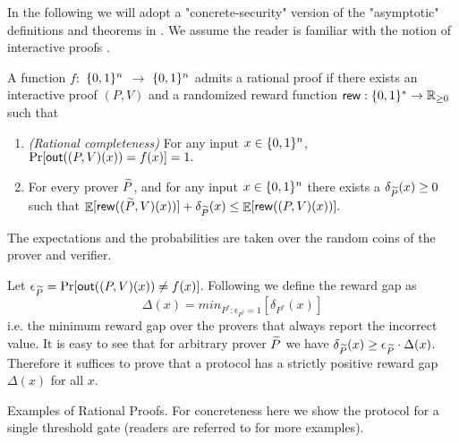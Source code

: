 
In the following we will adopt a "concrete-security" version of the "asymptotic" definitions and theorems in \cite{am1,rosen}. We assume the reader is familiar with the notion of interactive proofs \cite{gmr}. 

\noindent
\begin{mydef}
\label{def:RP-delta}
\label{def:RP}
A function $f:$ $\{0, 1\}^n$ $\to$ $\{0, 1\}^n$ admits a rational proof if there exists an interactive proof $(P,V)$ and a randomized reward function
$\mathsf{rew} : \{0, 1\}^{*} \to \mathbb{R}_{\geq 0}$ such that

\begin{enumerate}
\item \emph{(Rational completeness)} For any input $x \in 
\{0, 1\}^n$, $\Pr[\mathsf{out}((P,V)(x)) = f(x)] = 1.$

\item For every prover $\widetilde{P}$, and for any input $x \in 
\{0, 1\}^n$ there exists a $\delta_{\widetilde{P}}(x) \geq 0$ such that 
$ \mathop{\mathbb{E}}[\mathsf{rew}((\widetilde{P},V)(x))] + \delta_{\widetilde{P}}(x) \leq \mathop{\mathbb{E}}[\mathsf{rew}((P,V)(x))]. $
\end{enumerate}
The expectations and the probabilities are taken over the random coins of the prover and verifier.
\end{mydef} 

\noindent
Let $\epsilon_{\widetilde{P}} = \Pr[\mathsf{out}((P,V)(x)) \neq f(x)]$. 
Following \cite{rosen} we define the {\sf reward gap} as 
\[ \Delta(x) = min_{P^* : \epsilon_{P^*}=1}[\delta_{P^*}(x)]  \]
i.e. the minimum reward gap over the provers that always report the incorrect value. 
It is easy to see that for arbitrary prover $\widetilde{P}$ we have $\delta_{\widetilde{P}}(x) \geq 
\epsilon_{\widetilde{P}} \cdot \Delta(x)$. Therefore it suffices to prove that a protocol has 
a strictly positive reward gap $\Delta(x)$ for all $x$. 

\smallskip
\noindent
{\sc Examples of Rational Proofs.} For concreteness here we show the protocol for a single threshold gate (readers are referred to \cite{am,am1,rosen} for more examples). 

